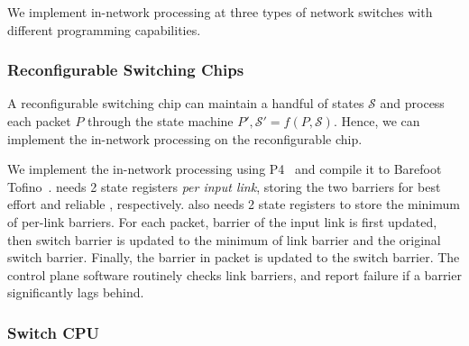 We implement in-network processing at three types of network switches with different programming capabilities.


\subsubsection{Reconfigurable Switching Chips}
\label{sec:p4}
A reconfigurable switching chip can maintain 
a handful of states $\mathcal{S}$ and process each packet $P$ through the state machine $P', \mathcal{S}' = f(P, \mathcal{S})$. Hence, we can implement the in-network processing on the reconfigurable chip. 

We implement the in-network processing using P4~\cite{bosshart2014p4} and compile it to Barefoot Tofino~\cite{tofino}. \sys{} needs 2 state registers \emph{per input link}, storing the two barriers for best effort and reliable \sys{}, respectively. \sys{} also needs 2 state registers to store the minimum of per-link barriers.
For each packet, barrier of the input link is first updated, then switch barrier is updated to the minimum of link barrier and the original switch barrier. Finally, the barrier in packet is updated to the switch barrier. The control plane software routinely checks link barriers, and report failure if a barrier significantly lags behind.



\subsubsection{Switch CPU}
\label{sec:commodity}

